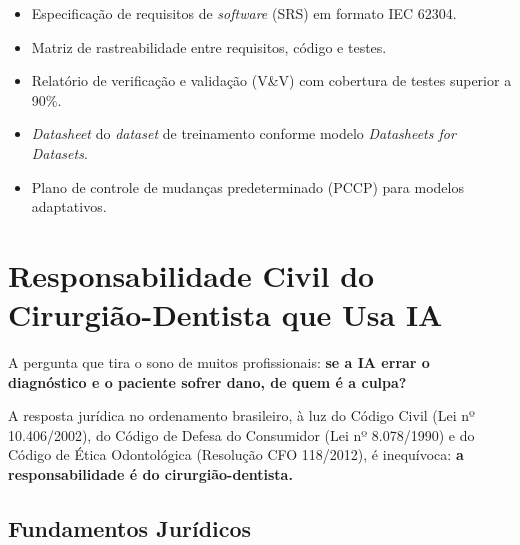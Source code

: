 \begin{itemize}
  \item Especificação de requisitos de \textit{software} (SRS) em formato
    IEC 62304.
  \item Matriz de rastreabilidade entre requisitos, código e testes.
  \item Relatório de verificação e validação (V\&V) com cobertura de testes
    superior a 90\%.
  \item \textit{Datasheet} do \textit{dataset} de treinamento conforme modelo
    \textit{Datasheets for Datasets}.
  \item Plano de controle de mudanças predeterminado (PCCP) para modelos
    adaptativos.
\end{itemize}

\section{Responsabilidade Civil do Cirurgião-Dentista que Usa IA}
\label{sec:responsabilidade-civil}

\nivelquatro

A pergunta que tira o sono de muitos profissionais: \textbf{se a IA errar o
diagnóstico e o paciente sofrer dano, de quem é a culpa?}

A resposta jurídica no ordenamento brasileiro, à luz do Código Civil (Lei nº
10.406/2002), do Código de Defesa do Consumidor (Lei nº 8.078/1990) e do
Código de Ética Odontológica (Resolução CFO 118/2012), é inequívoca:
\textbf{a responsabilidade é do cirurgião-dentista.}


\subsection{Fundamentos Jurídicos}

